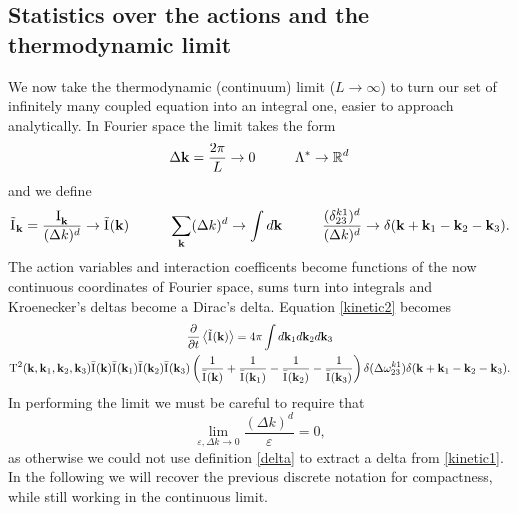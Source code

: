 \subsection{Statistics over the actions and the thermodynamic limit}

We now take the thermodynamic (continuum) limit ($L \rightarrow \infty$) to turn our set of infinitely many coupled equation into an integral one, easier to approach analytically.
In Fourier space the limit takes the form 
\begin{equation}
    \Delta\mathbf{ k} = \frac{2\pi}{L} \rightarrow 0 \hspace{10mm} \Lambda^* \rightarrow \mathbb{R}^d
\end{equation}
and we define 
\begin{equation}
    \tilde{\Ia}_\mathbf{k}=\frac{\Ia_\mathbf{k}}{(\Delta k)^d} \rightarrow \tilde{\Ia}(\mathbf{k}) \hspace{10mm} \sum_\mathbf{k} (\Delta k)^d \rightarrow \int d\mathbf{k} \hspace{10mm} 
    \frac{(\delta^{k1}_{23})^d}{(\Delta k)^d} \rightarrow \delta(\mathbf{k} + \mathbf{k}_1 - \mathbf{k}_2 - \mathbf{k}_3).
\end{equation}
The action variables and interaction coefficents become functions of the now continuous coordinates of Fourier space, sums turn into integrals and Kroenecker's deltas become a
Dirac's delta. Equation \eqref{kinetic2} becomes
\begin{multline}
    \frac{\partial}{\partial t} \left\langle \tilde{\mathrm{I}^{}}(\mathbf{k})\right\rangle = 4 \pi\int d\mathbf{k}_1 d\mathbf{k}_2 d\mathbf{k}_3 \\
    \mathrm{T}^2(\mathbf{k}, \mathbf{k}_1, \mathbf{k}_2, \mathbf{k}_3)\bar{\mathrm{I}^{}}(\mathbf{k})\bar{\mathrm{I}^{}}(\mathbf{k}_1)\bar{\mathrm{I}^{}}(\mathbf{k}_2)\bar{\mathrm{I}^{}}(\mathbf{k}_3)
    \left(\frac{1}{\bar{\mathrm{I}^{}}(\mathbf{k})} + \frac{1}{\bar{\mathrm{I}^{}}(\mathbf{k}_1)} - \frac{1}{\bar{\mathrm{I}^{}}(\mathbf{k}_2)}- \frac{1}{\bar{\mathrm{I}^{}}(\mathbf{k}_3)}  \right)
    \delta(\Delta{\omega}^{k1}_{23})\delta(\mathbf{k} + \mathbf{k}_1 - \mathbf{k}_2 - \mathbf{k}_3).
    \label{kinetic3}
\end{multline}
In performing the limit we must be careful to require that 
\begin{equation}
\underset{\varepsilon, \Delta k \rightarrow 0}{\lim} \frac{(\Delta k)^d}{\varepsilon} = 0 ,
\end{equation}
as otherwise we could not use definition \eqref{delta} to extract a delta from \eqref{kinetic1}. \\
In the following we will recover the previous discrete notation for compactness, while still working in the continuous limit.\\

